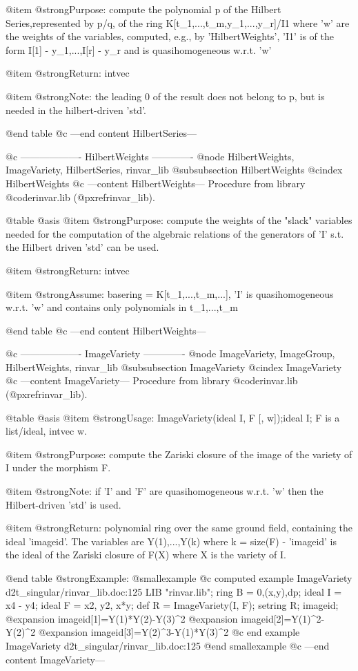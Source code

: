 @item @strong{Purpose:}
compute the polynomial p of the Hilbert Series,represented by p/q, of
the ring K[t_1,...,t_m,y_1,...,y_r]/I1 where 'w' are the weights of
the variables, computed, e.g., by 'HilbertWeights', 'I1' is of the
form I[1] - y_1,...,I[r] - y_r and is quasihomogeneous w.r.t. 'w'

@item @strong{Return:}
intvec

@item @strong{Note:}
the leading 0 of the result does not belong to p, but is needed in
the hilbert-driven 'std'.

@end table
@c ---end content HilbertSeries---

@c ------------------- HilbertWeights -------------
@node HilbertWeights, ImageVariety, HilbertSeries, rinvar_lib
@subsubsection HilbertWeights
@cindex HilbertWeights
@c ---content HilbertWeights---
Procedure from library @code{rinvar.lib} (@pxref{rinvar_lib}).

@table @asis
@item @strong{Purpose:}
compute the weights of the "slack" variables needed for the
computation of the algebraic relations of the generators of 'I' s.t.
the Hilbert driven 'std' can be used.

@item @strong{Return:}
intvec

@item @strong{Assume:}
basering = K[t_1,...,t_m,...], 'I' is quasihomogeneous w.r.t. 'w' and
contains only polynomials in t_1,...,t_m

@end table
@c ---end content HilbertWeights---

@c ------------------- ImageVariety -------------
@node ImageVariety, ImageGroup, HilbertWeights, rinvar_lib
@subsubsection ImageVariety
@cindex ImageVariety
@c ---content ImageVariety---
Procedure from library @code{rinvar.lib} (@pxref{rinvar_lib}).

@table @asis
@item @strong{Usage:}
ImageVariety(ideal I, F [, w]);ideal I; F is a list/ideal, intvec w.

@item @strong{Purpose:}
compute the Zariski closure of the image of the variety of I under
the morphism F.

@item @strong{Note:}
if 'I' and 'F' are quasihomogeneous w.r.t. 'w' then the Hilbert-driven
'std' is used.

@item @strong{Return:}
polynomial ring over the same ground field, containing the ideal
'imageid'. The variables are Y(1),...,Y(k) where k = size(F)
- 'imageid' is the ideal of the Zariski closure of F(X) where
X is the variety of I.

@end table
@strong{Example:}
@smallexample
@c computed example ImageVariety d2t_singular/rinvar_lib.doc:125 
LIB "rinvar.lib";
ring B   = 0,(x,y),dp;
ideal I  = x4 - y4;
ideal F  = x2, y2, x*y;
def R = ImageVariety(I, F);
setring R;
imageid;
@expansion{} imageid[1]=Y(1)*Y(2)-Y(3)^2
@expansion{} imageid[2]=Y(1)^2-Y(2)^2
@expansion{} imageid[3]=Y(2)^3-Y(1)*Y(3)^2
@c end example ImageVariety d2t_singular/rinvar_lib.doc:125
@end smallexample
@c ---end content ImageVariety---

